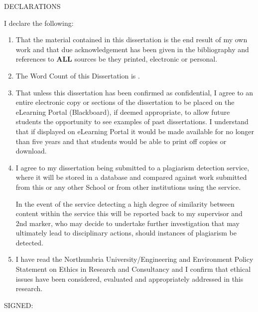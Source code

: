 DECLARATIONS

I declare the following:

\begin{enumerate}
    \item That the material contained in this dissertation is the end result of my own work and that due acknowledgement
          has been given in the bibliography and references to \textbf{ALL} sources be they printed, electronic or personal.

    \item The Word Count of this Dissertation is \wordcount.

    \item That unless this dissertation has been confirmed as confidential, I agree to an entire electronic copy or sections
          of the dissertation to be placed on the eLearning Portal (Blackboard), if deemed appropriate, to allow future students
          the opportunity to see examples of past dissertations. I understand that if displayed on eLearning Portal it would be
          made available for no longer than five years and that students would be able to print off copies or download.

    \item I agree to my dissertation being submitted to a plagiarism detection service, where it will be stored in a database
          and compared against work submitted from this or any other School or from other institutions using the service.

          In the event of the service detecting a high degree of similarity between content within the service this will
          be reported back to my supervisor and 2nd marker, who may decide to undertake further investigation that may
          ultimately lead to disciplinary actions, should instances of plagiarism be detected.

    \item I have read the Northumbria University/Engineering and Environment Policy \linebreak Statement on Ethics
          in Research and Consultancy and I confirm that ethical issues have been considered, evaluated and appropriately addressed in this research.
\end{enumerate}

SIGNED:
